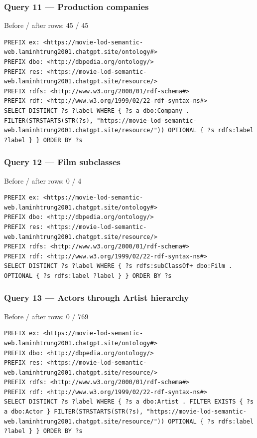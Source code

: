 \documentclass[
  11pt,
]{article}
\begin{document}
\subsubsection{Query 11 --- Production
companies}\label{query-11-production-companies}

Before / after rows: 45 / 45

\begin{verbatim}
PREFIX ex: <https://movie-lod-semantic-web.laminhtrung2001.chatgpt.site/ontology#>
PREFIX dbo: <http://dbpedia.org/ontology/>
PREFIX res: <https://movie-lod-semantic-web.laminhtrung2001.chatgpt.site/resource/>
PREFIX rdfs: <http://www.w3.org/2000/01/rdf-schema#>
PREFIX rdf: <http://www.w3.org/1999/02/22-rdf-syntax-ns#>
SELECT DISTINCT ?s ?label WHERE { ?s a dbo:Company . FILTER(STRSTARTS(STR(?s), "https://movie-lod-semantic-web.laminhtrung2001.chatgpt.site/resource/")) OPTIONAL { ?s rdfs:label ?label } } ORDER BY ?s
\end{verbatim}

\subsubsection{Query 12 --- Film
subclasses}\label{query-12-film-subclasses}

Before / after rows: 0 / 4

\begin{verbatim}
PREFIX ex: <https://movie-lod-semantic-web.laminhtrung2001.chatgpt.site/ontology#>
PREFIX dbo: <http://dbpedia.org/ontology/>
PREFIX res: <https://movie-lod-semantic-web.laminhtrung2001.chatgpt.site/resource/>
PREFIX rdfs: <http://www.w3.org/2000/01/rdf-schema#>
PREFIX rdf: <http://www.w3.org/1999/02/22-rdf-syntax-ns#>
SELECT DISTINCT ?s ?label WHERE { ?s rdfs:subClassOf+ dbo:Film . OPTIONAL { ?s rdfs:label ?label } } ORDER BY ?s
\end{verbatim}

\subsubsection{Query 13 --- Actors through Artist
hierarchy}\label{query-13-actors-through-artist-hierarchy}

Before / after rows: 0 / 769

\begin{verbatim}
PREFIX ex: <https://movie-lod-semantic-web.laminhtrung2001.chatgpt.site/ontology#>
PREFIX dbo: <http://dbpedia.org/ontology/>
PREFIX res: <https://movie-lod-semantic-web.laminhtrung2001.chatgpt.site/resource/>
PREFIX rdfs: <http://www.w3.org/2000/01/rdf-schema#>
PREFIX rdf: <http://www.w3.org/1999/02/22-rdf-syntax-ns#>
SELECT DISTINCT ?s ?label WHERE { ?s a dbo:Artist . FILTER EXISTS { ?s a dbo:Actor } FILTER(STRSTARTS(STR(?s), "https://movie-lod-semantic-web.laminhtrung2001.chatgpt.site/resource/")) OPTIONAL { ?s rdfs:label ?label } } ORDER BY ?s
\end{verbatim}
\end{document}
